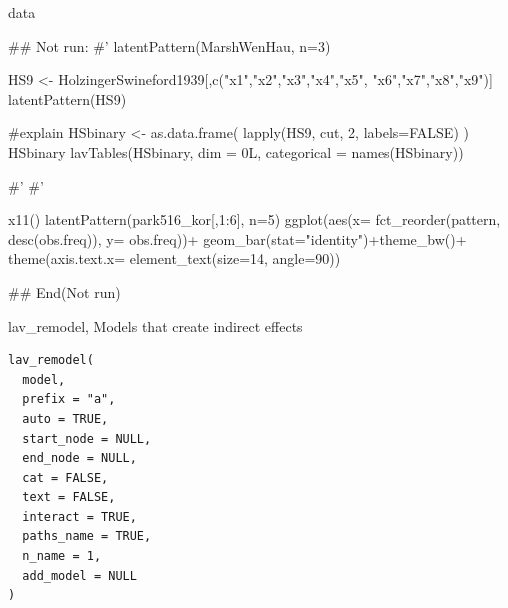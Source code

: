 \documentclass[a4paper]{book}
\begin{document}
%
\begin{Value}
data
\end{Value}
%
\begin{Examples}
\begin{ExampleCode}

\#\# Not run: 
#'
latentPattern(MarshWenHau, n=3)

HS9 <- HolzingerSwineford1939[,c("x1","x2","x3","x4","x5",
                                 "x6","x7","x8","x9")]
latentPattern(HS9)

#explain
HSbinary <- as.data.frame( lapply(HS9, cut, 2, labels=FALSE) )
HSbinary %
lavTables(HSbinary, dim = 0L, categorical = names(HSbinary)) %

#'
#'

x11()
latentPattern(park516_kor[,1:6], n=5) %
  ggplot(aes(x= fct_reorder(pattern, desc(obs.freq)), y= obs.freq))+
  geom_bar(stat="identity")+theme_bw()+
  theme(axis.text.x= element_text(size=14, angle=90))

## End(Not run)


\end{ExampleCode}
\end{Examples}
%
\begin{Description}
lav\_remodel, Models that create indirect effects
\end{Description}
%
\begin{Usage}
\begin{verbatim}
lav_remodel(
  model,
  prefix = "a",
  auto = TRUE,
  start_node = NULL,
  end_node = NULL,
  cat = FALSE,
  text = FALSE,
  interact = TRUE,
  paths_name = TRUE,
  n_name = 1,
  add_model = NULL
)
\end{verbatim}
\end{Usage}
%
\end{document}
